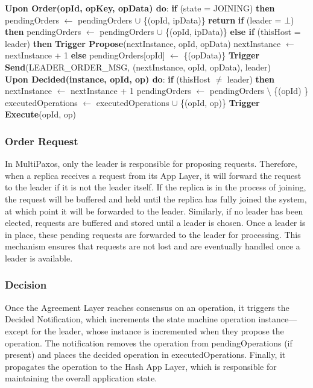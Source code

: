 \documentclass[sigconf]{acmart}
\begin{document}
\begin{algorithmic}[1]
\State \textbf{Upon Order(opId, opKey, opData) do}:
\State \quad \textbf{if} (state = JOINING) \textbf{then}
\State \quad \quad pendingOrders $\gets$ pendingOrders $\cup$ \{(opId, ipData)\}
\State \quad \quad \textbf{return}
\State \quad \textbf{if} (leader = $\bot$) \textbf{then}
\State \quad \quad pendingOrders $\gets$ pendingOrders $\cup$ \{(opId, ipData)\}
\State \quad \textbf{else if} (thisHost = leader) \textbf{then}
\State \quad \quad \textbf{Trigger Propose}(nextInstance, opId, opData)
\State \quad \quad nextInstance $\gets$ nextInstance + 1
\State \quad \textbf{else}
\State \quad \quad pendingOrders[opId] $\gets$ \{(opData)\}
\State \quad \quad \textbf{Trigger Send}(LEADER\_ORDER\_MSG, (nextInstance, opId, opData), leader) \\

\State \textbf{Upon Decided(instance, opId, op) do}:
\State \quad \textbf{if} (thisHost $\neq$ leader) \textbf{then}
\State \quad \quad nextInstance $\gets$ nextInstance + 1
\State \quad pendingOrders $\gets$ pendingOrders $\setminus$ \{(opId) \}
\State \quad executedOperations $\gets$ executedOperations $\cup$ \{(opId, op)\}
\State \quad \textbf{Trigger Execute}(opId, op) \\

\end{algorithmic}

\subsubsection{Order Request}
In MultiPaxos, only the leader is responsible for proposing requests. Therefore, when a replica receives a request from its App Layer, it will forward the request to the leader if it is not the leader itself. If the replica is in the process of joining, the request will be buffered and held until the replica has fully joined the system, at which point it will be forwarded to the leader. Similarly, if no leader has been elected, requests are buffered and stored until a leader is chosen. Once a leader is in place, these pending requests are forwarded to the leader for processing. This mechanism ensures that requests are not lost and are eventually handled once a leader is available. \\

\subsubsection{Decision}
Once the Agreement Layer reaches consensus on an operation, it triggers the Decided Notification, which increments the state machine operation instance—except for the leader, whose instance is incremented when they propose the operation. The notification removes the operation from pendingOperations (if present) and places the decided operation in executedOperations. Finally, it propagates the operation to the Hash App Layer, which is responsible for maintaining the overall application state. \\
\end{document}
